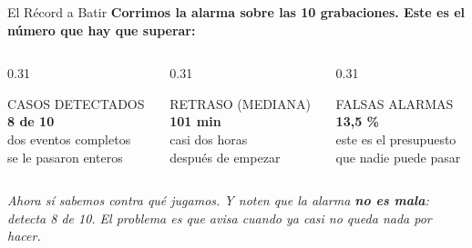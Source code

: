 \documentclass[aspectratio=169, 11pt]{beamer}
\begin{document}
\begin{frame}[shrink=8]{El Récord a Batir}
  \vspace{-4pt}
  {\small\color{arcaDark}\bfseries
   Corrimos la alarma sobre las 10 grabaciones. Este es el número que hay
   que superar:}
  \vspace{10pt}
  \begin{columns}[T]
    \begin{column}{0.31\textwidth}
      \begin{tcolorbox}[colback=arcaGray, colframe=arcaDark, boxrule=0pt, leftrule=3pt,
        arc=3pt, left=6pt, right=6pt, top=6pt, bottom=6pt]
        \centering
        {\scriptsize\color{textMuted}CASOS DETECTADOS}\\[4pt]
        {\LARGE\color{arcaDark}\bfseries 8 de 10}\\[4pt]
        {\scriptsize\color{textMuted}dos eventos completos\\se le pasaron enteros}
      \end{tcolorbox}
    \end{column}
    \begin{column}{0.31\textwidth}
      \begin{tcolorbox}[colback=arcaGray, colframe=arcaRed, boxrule=0pt, leftrule=3pt,
        arc=3pt, left=6pt, right=6pt, top=6pt, bottom=6pt]
        \centering
        {\scriptsize\color{textMuted}RETRASO (MEDIANA)}\\[4pt]
        {\LARGE\color{arcaRed}\bfseries 101 min}\\[4pt]
        {\scriptsize\color{textMuted}casi dos horas\\después de empezar}
      \end{tcolorbox}
    \end{column}
    \begin{column}{0.31\textwidth}
      \begin{tcolorbox}[colback=arcaGray, colframe=codeBlue, boxrule=0pt, leftrule=3pt,
        arc=3pt, left=6pt, right=6pt, top=6pt, bottom=6pt]
        \centering
        {\scriptsize\color{textMuted}FALSAS ALARMAS}\\[4pt]
        {\LARGE\color{codeBlue}\bfseries 13{,}5 \%}\\[4pt]
        {\scriptsize\color{textMuted}este es el presupuesto\\que nadie puede pasar}
      \end{tcolorbox}
    \end{column}
  \end{columns}
  \vspace{10pt}
  {\footnotesize\color{arcaDark}\itshape
   Ahora sí sabemos contra qué jugamos. Y noten que la alarma \textbf{no es
   mala}: detecta 8 de 10. El problema es que avisa cuando ya casi no queda
   nada por hacer.}
\end{frame}
\end{document}
